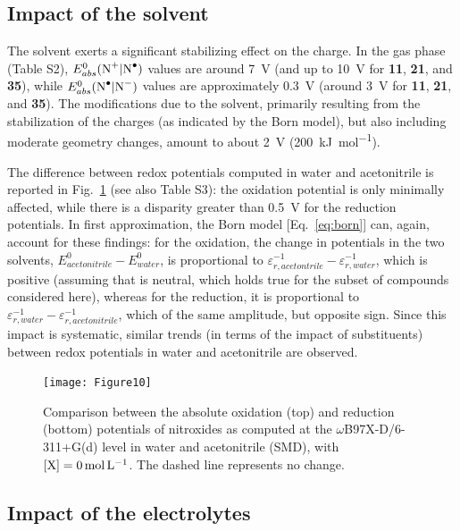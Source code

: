 \documentclass[review,preprint]{elsarticle}
\begin{document}
\clearpage

\subsection{Impact of the solvent} \label{sec:solv}

The solvent exerts a significant stabilizing effect on the charge. In the gas phase (Table S2), $E^0_{abs}(\ce{N+}|\ce{N^.})$ values are around \SI{7}{\volt} (and up to \SI{10}{\volt} for \textbf{11}, \textbf{21}, and \textbf{35}), while $E^0_{abs}(\ce{N^.}|\ce{N-})$ values are approximately \SI{0.3}{\volt} (around \SI{3}{\volt} for \textbf{11}, \textbf{21}, and \textbf{35}). The modifications due to the solvent, primarily resulting from the stabilization of the charges (as indicated by the Born model), but also including moderate geometry changes, amount to about \SI{2}{\volt} (\SI{200}{\kilo\joule\per\mole}).

The difference between redox potentials computed in water and acetonitrile is reported in Fig.~\ref{fig:watvsac} (see also Table S3):  the oxidation potential is only minimally affected, while there is a disparity greater than \SI{0.5}{\volt} for the reduction potentials. In first approximation, the Born model [Eq.~\eqref{eq:born}] can, again, account for these findings: for the oxidation, the change in potentials in the two solvents, $E^0_{acetonitrile} - E^0_{water}$, is proportional to $\varepsilon_{r,acetontrile}^{-1}-\varepsilon_{r,water}^{-1}$, which is positive (assuming that  is neutral, which holds true for the subset of compounds considered here), whereas for the reduction, it is proportional to $\varepsilon_{r,water}^{-1}-\varepsilon_{r,acetonitrile}^{-1}$, which of the same amplitude, but opposite sign. Since this impact is systematic, similar trends (in terms of the impact of substituents) between redox potentials in water and acetonitrile are observed.


\begin{figure}[!h]
	\centering
	\texttt{[image: Figure10]}
	\caption{Comparison between the absolute oxidation (top) and reduction (bottom) potentials of nitroxides as computed at the $\omega$B97X-D/6-311+G(d) level in water and acetonitrile (SMD), with $[\ce{X}]=\SI{0}{\mole\per\liter}$. The dashed line represents no change. }
	\label{fig:watvsac}
\end{figure}

\clearpage
\subsection{Impact of the electrolytes} \label{sec:elect}
\end{document}
